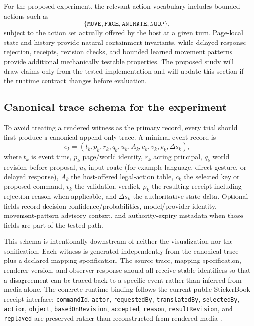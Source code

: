\documentclass[11pt]{article}
\begin{document}
For the proposed experiment, the relevant action vocabulary includes bounded actions such as
\begin{equation}
\{\texttt{MOVE},\texttt{FACE},\texttt{ANIMATE},\texttt{NOOP}\},
\end{equation}
subject to the action set actually offered by the host at a given turn. Page-local state and history provide natural containment invariants, while delayed-response rejection, receipts, revision checks, and bounded learned movement patterns provide additional mechanically testable properties. The proposed study will draw claims only from the tested implementation and will update this section if the runtime contract changes before evaluation.

\subsection{Canonical trace schema for the experiment}
To avoid treating a rendered witness as the primary record, every trial should first produce a canonical append-only trace. A minimal event record is
\begin{equation}
 e_k = (t_k,p_k,r_k,q_k,u_k,A_k,c_k,v_k,\rho_k,\Delta s_k),
\end{equation}
where $t_k$ is event time, $p_k$ page/world identity, $r_k$ acting principal, $q_k$ world revision before proposal, $u_k$ input route (for example language, direct gesture, or delayed response), $A_k$ the host-offered legal-action table, $c_k$ the selected key or proposed command, $v_k$ the validation verdict, $\rho_k$ the resulting receipt including rejection reason when applicable, and $\Delta s_k$ the authoritative state delta. Optional fields record decision confidence/probabilities, model/provider identity, movement-pattern advisory context, and authority-expiry metadata when those fields are part of the tested path.

This schema is intentionally downstream of neither the visualization nor the sonification. Each witness is generated independently from the canonical trace plus a declared mapping specification. The source trace, mapping specification, renderer version, and observer response should all receive stable identifiers so that a disagreement can be traced back to a specific event rather than inferred from media alone. The concrete runtime binding follows the current public StickerBook receipt interface: \texttt{commandId}, \texttt{actor}, \texttt{requestedBy}, \texttt{translatedBy}, \texttt{selectedBy}, \texttt{action}, \texttt{object}, \texttt{basedOnRevision}, \texttt{accepted}, \texttt{reason}, \texttt{resultRevision}, and \texttt{replayed} are preserved rather than reconstructed from rendered media \citep{tiffany2026stickerbookcore,tiffany2026stickerbookinterface}.
\end{document}
